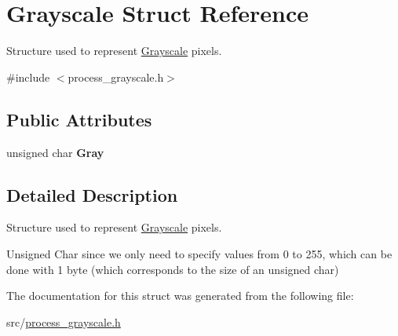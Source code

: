 \hypertarget{structGrayscale}{}\section{Grayscale Struct Reference}
\label{structGrayscale}


Structure used to represent \hyperlink{structGrayscale}{Grayscale} pixels.  




{\ttfamily \#include $<$process\+\_\+grayscale.\+h$>$}

\subsection*{Public Attributes}
\begin{DoxyCompactItemize}
\item 
\mbox{\label{structGrayscale_a184a20a6c28cc4607c2545c468fc5ef5}} 
unsigned char {\bfseries Gray}
\end{DoxyCompactItemize}


\subsection{Detailed Description}
Structure used to represent \hyperlink{structGrayscale}{Grayscale} pixels. 

Unsigned Char since we only need to specify values from 0 to 255, which can be done with 1 byte (which corresponds to the size of an unsigned char) 

The documentation for this struct was generated from the following file\+:\begin{DoxyCompactItemize}
\item 
src/\hyperlink{process__grayscale_8h}{process\+\_\+grayscale.\+h}\end{DoxyCompactItemize}

